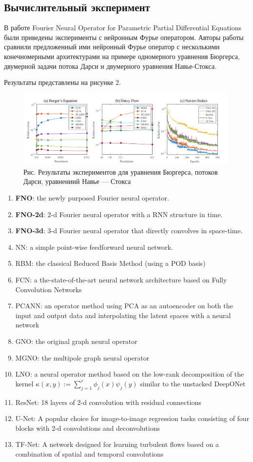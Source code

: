 \subsection{Вычислительный эксперимент}
В работе Fourier Neural Operator for Parametric Partial Differential Equations были приведены эксперименты с нейронным Фурье оператором. Авторы работы сравнили предложенный ими нейронный Фурье оператор с несколькими конечномерными архитектурами на примере одномерного уравнения Бюргерса, двумерной задачи потока Дарси и двумерного уравнения Навье-Стокса.

Результаты представлены на рисунке 2.
\begin{figure}[h]
	\centering
	\includegraphics[width=0.99\textwidth]{chapters/severilov_s1/pics/experiments}
	\caption{Рис. Результаты экспериментов для уравнения Бюргерса, потоков Дарси, уравнениий Навье — Стокса}
\end{figure}

\begin{enumerate}
	\item \textbf{FNO}: the newly purposed Fourier neural operator.
	\item \textbf{FNO-2d}: 2-d Fourier neural operator with a RNN structure in time.
	\item \textbf{FNO-3d}: 3-d Fourier neural operator that directly convolves in space-time.
	\item NN: a simple point-wise feedforward neural network.
	\item RBM: the classical Reduced Basis Method (using a POD basis) 
	\item FCN: a the-state-of-the-art neural network architecture based on Fully Convolution Networks
	\item PCANN: an operator method using PCA as an autoencoder on both the input and output data and interpolating the latent spaces with a neural network
	\item GNO: the original graph neural operator
	\item MGNO: the multipole graph neural operator
	\item LNO: a neural operator method based on the low-rank decomposition of the kernel $\kappa(x, y):=\sum_{j=1}^{r} \phi_{j}(x) \psi_{j}(y)$ similar to the unstacked DeepONet
	\item ResNet: 18 layers of 2-d convolution with residual connections
	\item U-Net: A popular choice for image-to-image regression tasks consisting of four blocks with 2-d convolutions and deconvolutions
	\item TF-Net: A network designed for learning turbulent flows based on a combination of spatial and temporal convolutions 
	
\end{enumerate}


